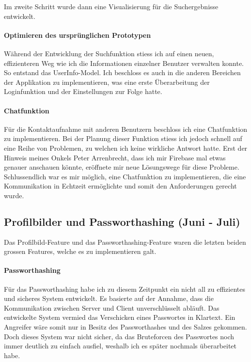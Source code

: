 \documentclass[../main.tex]{subfiles}
\begin{document}
	Im zweite Schritt wurde dann eine Visualisierung für die Suchergebnisse entwickelt.
	
	\paragraph{Optimieren des ursprünglichen Prototypen}
	Während der Entwicklung der Suchfunktion stiess ich auf einen neuen, effizienteren Weg wie ich die Informationen einzelner Benutzer verwalten konnte. So entstand das UserInfo-Model. Ich beschloss es auch in die anderen Bereichen der Applikation zu implementieren, was eine erste Überarbeitung der Loginfunktion und der Einstellungen zur Folge hatte.
	
	\paragraph{Chatfunktion}
	Für die Kontaktaufnahme mit anderen Benutzern beschloss ich eine Chatfunktion zu implementieren. Bei der Planung dieser Funktion stiess ich jedoch schnell auf eine Reihe von Problemen, zu welchen ich keine wirkliche Antwort hatte. Erst der Hinweis meines Onkels Peter Arrenbrecht, dass ich mir Firebase mal etwas genauer anschauen könnte, eröffnete mir neue Lösungswege für diese Probleme. Schlussendlich war es mir möglich, eine Chatfunktion zu implementieren, die eine Kommunikation in Echtzeit ermöglichte und somit den Anforderungen gerecht wurde.
	
	\subsection{Profilbilder und Passworthashing (Juni - Juli)}
	Das Profilbild-Feature und das Passworthashing-Feature waren die letzten beiden grossen Features, welche es zu implementieren galt.
	\paragraph{Passworthashing}
	Für das Passworthashing habe ich zu diesem Zeitpunkt ein nicht all zu effizientes und sicheres System entwickelt. Es basierte auf der Annahme, dass die Kommunikation zwischen Server und Client unverschlüsselt abläuft. Das entwickelte System vermied das Verschicken eines Passwortes in Klartext. Ein Angreifer wäre somit nur in Besitz des Passworthashes und des Salzes gekommen. Doch dieses System war nicht sicher, da das Bruteforcen des Passwortes noch immer deutlich zu einfach ausfiel, weshalb ich es später nochmals überarbeitet habe.
	
\end{document}

